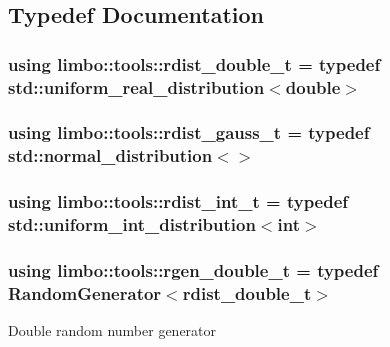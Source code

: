 \subsection{Typedef Documentation}
\subsubsection[{\texorpdfstring{rdist\+\_\+double\+\_\+t}{rdist_double_t}}]{\setlength{\rightskip}{0pt plus 5cm}using {\bf limbo\+::tools\+::rdist\+\_\+double\+\_\+t} = typedef std\+::uniform\+\_\+real\+\_\+distribution$<$double$>$}\hypertarget{group__tools_gab2609bfef1e3bdb8b44c0d6c8c139927}{}\label{group__tools_gab2609bfef1e3bdb8b44c0d6c8c139927}
\subsubsection[{\texorpdfstring{rdist\+\_\+gauss\+\_\+t}{rdist_gauss_t}}]{\setlength{\rightskip}{0pt plus 5cm}using {\bf limbo\+::tools\+::rdist\+\_\+gauss\+\_\+t} = typedef std\+::normal\+\_\+distribution$<$$>$}\hypertarget{group__tools_ga38a794bf956d6bdd1e55f43357826b79}{}\label{group__tools_ga38a794bf956d6bdd1e55f43357826b79}
\subsubsection[{\texorpdfstring{rdist\+\_\+int\+\_\+t}{rdist_int_t}}]{\setlength{\rightskip}{0pt plus 5cm}using {\bf limbo\+::tools\+::rdist\+\_\+int\+\_\+t} = typedef std\+::uniform\+\_\+int\+\_\+distribution$<$int$>$}\hypertarget{group__tools_gacb322b4600b2e500dbcd24661a749f49}{}\label{group__tools_gacb322b4600b2e500dbcd24661a749f49}
\subsubsection[{\texorpdfstring{rgen\+\_\+double\+\_\+t}{rgen_double_t}}]{\setlength{\rightskip}{0pt plus 5cm}using {\bf limbo\+::tools\+::rgen\+\_\+double\+\_\+t} = typedef Random\+Generator$<$rdist\+\_\+double\+\_\+t$>$}\hypertarget{group__tools_gacdb2963659056fc5fa9f94405f59a851}{}\label{group__tools_gacdb2963659056fc5fa9f94405f59a851}
Double random number generator 
